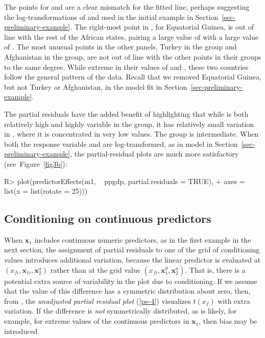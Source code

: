 \documentclass[article]{jss}
\newcommand{\x}{\mathbf{x}}
\begin{document}
The points for  and  are a clear mismatch for the fitted line, perhaps suggesting the log-transformations of  and  used in the initial example in Section~\ref{sec-preliminary-example}. The right-most point in , for Equatorial Guinea, is out of line with the rest of the African states, pairing a large value of  with a large value of . The most unusual points in the other panels, Turkey in the  group and Afghanistan in the  group, are not out of line with the other points in their groups to the same degree. While extreme in their values of  and , these two countries follow the general pattern of the data. Recall that we removed Equatorial Guinea, but not Turkey or Afghanistan, in the model fit in Section~\ref{sec-preliminary-example}.

The partial residuals have the added benefit of highlighting that while  is both relatively high and highly variable in the  group, it has relatively small variation in , where it is concentrated in very low values.  The  group is intermediate.  When both the response variable and  are log-transformed, as in model  in Section~\ref{sec-preliminary-example}, the partial-residual plots are much more satisfactory (see~Figure~\ref{fig3b}):
%
\begin{Schunk}
\begin{Sinput}
R> plot(predictorEffects(m1, ~ ppgdp, partial.residuals = TRUE),
+    axes = list(x = list(rotate = 25)))
\end{Sinput}
\end{Schunk}

\subsection{Conditioning on continuous predictors}

When $\x_1$ includes continuous numeric predictors, as in the first example in the next section, the assignment of partial residuals to one of the grid of conditioning values introduces additional variation, because the linear predictor is evaluated at $(x_{fi}, \x_{1i}, \x_{2}^a)$ rather than at the grid value $(x_{fi}, \x_{1}^g, \x_{2}^a)$.  That is, there is a potential extra source of variability in the plot due to conditioning.  If we assume that the value of this difference has a symmetric distribution about zero, then, from \citet[Lemma 2.1]{Cook93}, the  \emph{unadjusted partial residual plot} (\ref{pe-4}) visualizes  $t(x_f)$ with extra variation. If the difference is \emph{not} symmetrically distributed, as is likely, for example, for extreme values of the continuous predictors in $\x_1$, then bias may be introduced.
\end{document}
